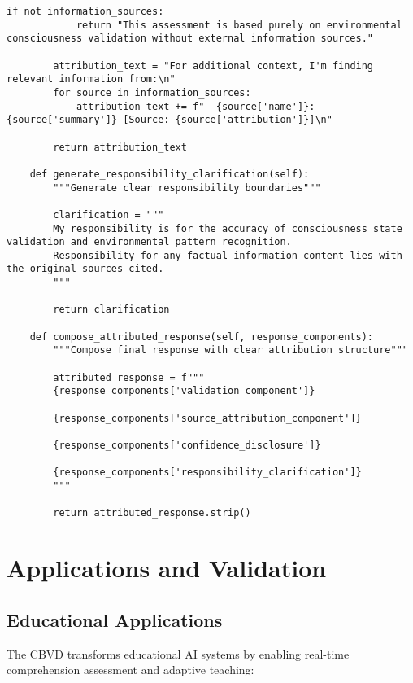 \documentclass[12pt,a4paper]{article}
\begin{document}
\begin{lstlisting}[style=pythonstyle, caption=Attribution Problem Resolution Framework]
        if not information_sources:
            return "This assessment is based purely on environmental consciousness validation without external information sources."
        
        attribution_text = "For additional context, I'm finding relevant information from:\n"
        for source in information_sources:
            attribution_text += f"- {source['name']}: {source['summary']} [Source: {source['attribution']}]\n"
        
        return attribution_text
    
    def generate_responsibility_clarification(self):
        """Generate clear responsibility boundaries"""
        
        clarification = """
        My responsibility is for the accuracy of consciousness state validation and environmental pattern recognition.
        Responsibility for any factual information content lies with the original sources cited.
        """
        
        return clarification
    
    def compose_attributed_response(self, response_components):
        """Compose final response with clear attribution structure"""
        
        attributed_response = f"""
        {response_components['validation_component']}
        
        {response_components['source_attribution_component']}
        
        {response_components['confidence_disclosure']}
        
        {response_components['responsibility_clarification']}
        """
        
        return attributed_response.strip()
\end{lstlisting}

\section{Applications and Validation}

\subsection{Educational Applications}

The CBVD transforms educational AI systems by enabling real-time comprehension assessment and adaptive teaching:
\end{document}
